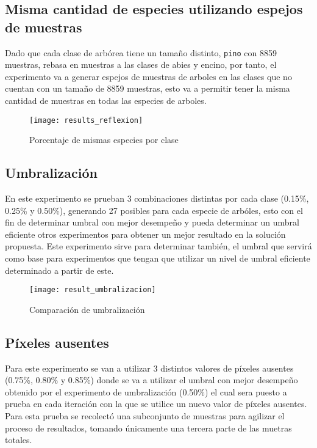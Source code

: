 \newpage
\subsection{Misma cantidad de especies utilizando espejos de muestras}
Dado que cada clase  de arbórea tiene un tamaño distinto, \texttt{pino} con 8859 muestras, rebasa en muestras a las clases de abies  y encino, por tanto, el experimento va a generar espejos de muestras de arboles  en las clases que no cuentan con un tamaño de 8859 muestras, esto va a permitir tener la misma cantidad de muestras en todas las especies de arboles. 
\begin{figure}[h!]
  \centering  
  \begin{minipage}[b]{0.75\textwidth}
        \texttt{[image: results\_reflexion]}
    \caption{Porcentaje de mismas especies por clase} 
    \label{Porcentaje de mismas especies por clase}
  \end{minipage}
\end{figure}

\newpage
\subsection{Umbralización}
En este experimento se prueban 3 combinaciones distintas por cada clase (0.15\%, 0.25\% y 0.50\%), generando 27 posibles para cada especie de arbóles, esto con el fin de determinar umbral con mejor desempeño y pueda determinar un umbral eficiente otros experimentos para obtener un mejor resultado en la solución propuesta. Este experimento sirve para determinar también, el umbral que servirá como base para experimentos que tengan que utilizar un nivel de umbral eficiente determinado a partir de este.


\begin{figure}[h!]
  \centering  
  \begin{minipage}[b]{0.65\textwidth}
        \texttt{[image: result\_umbralizacion]}
    \caption{Comparación de umbralización} 
    \label{Comparación de umbralización}
  \end{minipage}
\end{figure}

\newpage

\subsection{Píxeles ausentes}
Para este experimento se van a utilizar 3 distintos valores de píxeles ausentes (0.75\%, 0.80\% y 0.85\%) donde se va a utilizar el umbral con mejor desempeño obtenido por el experimento de umbralización (0.50\%) el cual sera puesto a prueba en cada iteración con la que se utilice un nuevo valor de píxeles ausentes. Para esta prueba se recolectó una subconjunto de muestras para agilizar el proceso de resultados, tomando únicamente una tercera parte de las muetras totales.

